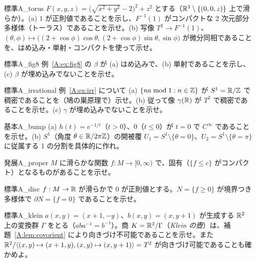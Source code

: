 \begin{probl}{標準}{A_torus}
$F(x,y,z)=\bigl(\sqrt{x^2+y^2}-2\bigr)^2+z^2$ とする（$\mathbb R^3\setminus\{(0,0,z)\}$ 上で滑らか）。(a) $1$ が正則値であることを示し、$F^{-1}(1)$ がコンパクトな 2 次元部分多様体（トーラス）であることを示せ。(b) 写像 $T^2\to F^{-1}(1)$、$(\theta,\phi)\mapsto\bigl((2+\cos\phi)\cos\theta,(2+\cos\phi)\sin\theta,\sin\phi\bigr)$ が微分同相であることを、はめ込み・単射・コンパクトを使って示せ。
\end{probl}

\begin{probl}{標準}{A_fig8}
例~\ref{A:ex:fig8} の $\beta$ が (a) はめ込みで、(b) 単射であることを示し、(c) $\beta$ が埋め込みでないことを示せ。
\end{probl}

\begin{probl}{標準}{A_irrational}
例~\ref{A:ex:irr} について (a) $\{na\bmod1:n\in\mathbb Z\}$ が $S^1=\mathbb R/\mathbb Z$ で稠密であることを（鳩の巣原理で）示せ。(b) 従って像 $\gamma(\mathbb R)$ が $T^2$ で稠密であることを示せ。(c) $\gamma$ が埋め込みでないことを示せ。
\end{probl}

\begin{probl}{基本}{A_bump}
(a) $h(t)=e^{-1/t}$（$t>0$）、$0$（$t\le0$）が $t=0$ で $C^\infty$ であることを示せ。(b) $S^1$（角度 $\theta\in\mathbb R/2\pi\mathbb Z$）の開被覆 $U_1=S^1\setminus\{\theta=0\}$、$U_2=S^1\setminus\{\theta=\pi\}$ に従属する 1 の分割を具体的に作れ。
\end{probl}

\begin{probl}{発展}{A_proper}
$M$ に滑らかな関数 $f:M\to[0,\infty)$ で、固有（$\{f\le c\}$ がコンパクト）となるものがあることを示せ。
\end{probl}

\begin{probl}{標準}{A_disc}
$f:M\to\mathbb R$ が滑らかで $0$ が正則値とする。$N=\{f\ge0\}$ が境界つき多様体で $\partial N=\{f=0\}$ であることを示せ。
\end{probl}

\begin{probl}{標準}{A_klein}
$a(x,y)=(x+1,-y)$、$b(x,y)=(x,y+1)$ が生成する $\mathbb R^2$ 上の変換群 $\Gamma$ をとる（$aba^{-1}=b^{-1}$）。商 $K=\mathbb R^2/\Gamma$（\emph{Klein の壺}）は、補題~\ref{A:lem:covorient} により向きづけ不可能であることを示せ。また $\mathbb R^2/\langle(x,y)\mapsto(x+1,y),(x,y)\mapsto(x,y+1)\rangle=T^2$ が向きづけ可能であることも確かめよ。
\end{probl}

